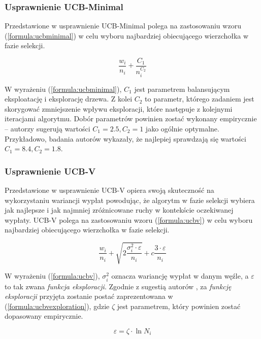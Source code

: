 \documentclass[a4paper,12pt]{article}
\begin{document}
\subsubsection{Usprawnienie UCB-Minimal} \label{subsec:ucbmin}
Przedstawione w \cite{ucbminimal} usprawnienie UCB-Minimal polega na zastosowaniu wzoru (\ref{formula:ucbminimal}) w celu wyboru najbardziej obiecującego wierzchołka w fazie selekcji.

\begin{equation}\label{formula:ucbminimal}
\frac{w_i}{n_i} + \frac{C_1}{n_i^{C_2}}
\end{equation}

W wyrażeniu (\ref{formula:ucbminimal}), $C_1$ jest parametrem balansującym eksploatację i eksplorację drzewa. Z kolei $C_2$ to parametr, którego zadaniem jest skorygować zmniejszenie wpływu eksploracji, które następuje z kolejnymi iteracjami algorytmu. Dobór parametrów powinien zostać wykonany empirycznie -- autorzy \cite{ucbminimal} sugerują wartości $C_1=2.5, C_2 = 1$ jako ogólnie optymalne. Przykładowo, badania autorów \cite{tron} wykazały, że najlepiej sprawdzają się wartości $C_1 = 8.4, C_2 = 1.8$.

\subsubsection{Usprawnienie UCB-V} \label{subsec:ucbv}
Przedstawione w \cite{ucbv} usprawnienie UCB-V opiera swoją skuteczność na wykorzystaniu wariancji wypłat powodując, że algorytm w fazie selekcji wybiera jak najlepsze i jak najmniej zróżnicowane ruchy w kontekście oczekiwanej wypłaty. UCB-V polega na zastosowaniu wzoru (\ref{formula:ucbv}) w celu wyboru najbardziej obiecującego wierzchołka w fazie selekcji.

\begin{equation}\label{formula:ucbv}
\frac{w_i}{n_i} + \sqrt{2\frac{\sigma^2_i \cdot \varepsilon}{n_i}} + c \frac{3\cdot\varepsilon}{n_i}
\end{equation}

W wyrażeniu (\ref{formula:ucbv}), $\sigma^2_i$ oznacza wariancję wypłat w danym węźle, a $\varepsilon$ to tak zwana \textit{funkcja eksploracji}. Zgodnie z sugestią autorów \cite{ucbv}, za \textit{funkcję eksploracji} przyjęta zostanie postać zaprezentowana w (\ref{formula:ucbvexploration}), gdzie $\zeta$ jest parametrem, który powinien zostać dopasowany empirycznie.

\begin{equation}\label{formula:ucbvexploration}
\varepsilon = \zeta\cdot\ln N_i
\end{equation}
\end{document}
